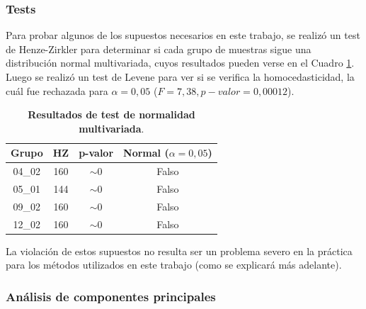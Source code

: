 \documentclass[12pt]{article}
\begin{document}
\subsubsection{Tests}

Para probar algunos de los supuestos necesarios en este trabajo, se realizó un test de Henze-Zirkler para determinar si cada grupo de muestras sigue una distribución normal multivariada, cuyos resultados pueden verse en el Cuadro \ref{table:normality}. Luego se realizó un test de Levene para ver si se verifica la homocedasticidad, la cuál fue rechazada para $\alpha = 0,05$ ($F = 7,38, p-valor = 0,00012$).




\begin{table}[htbp]
\centering
\begin{tabular}{|c|c|c|c|}
\hline
Grupo                        & HZ & p-valor & Normal ($\alpha = 0,05$) \\ \hline
04\_02                       & 160 & $\sim$0 & Falso      \\ \hline
05\_01                       & 144 & $\sim$0 & Falso       \\ \hline
09\_02                       & 160 & $\sim$0 & Falso      \\ \hline
12\_02                       & 160 & $\sim$0 & Falso       \\ \hline
\end{tabular}
\caption{\textbf{Resultados de test de normalidad multivariada}.}
\label{table:normality}
\end{table}

La violación de estos supuestos no resulta ser un problema severo en la práctica para los métodos utilizados en este trabajo (como se explicará más adelante).

\subsubsection{Análisis de componentes principales}
\end{document}
